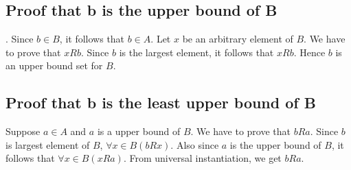 \documentclass{article}
\begin{document}
\subsection{Proof that b is the upper bound of B}.
Since $b \in B$, it follows that $b \in A$. Let $x$ be an arbitrary
element of $B$. We have to prove that $xRb$. Since $b$ is the largest
element, it follows that $xRb$. Hence $b$ is an upper bound set for
$B$.

\subsection{Proof that b is the least upper bound of B}
Suppose $a \in A$ and $a$ is a upper bound of $B$. We have to prove
that $bRa$. Since $b$ is largest element of $B$, $\forall x \in
B(bRx)$. Also since $a$ is the upper bound of $B$, it follows that
$\forall x \in B(xRa)$. From universal instantiation, we get $bRa$.
  
\end{document}
